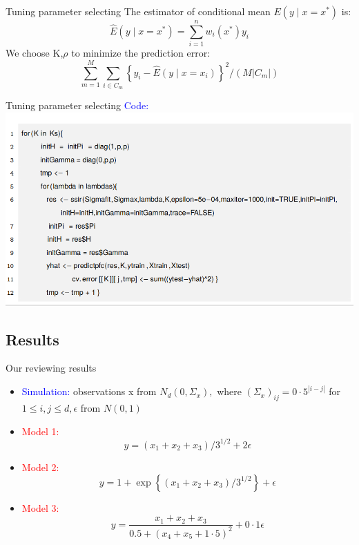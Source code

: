 \documentclass{beamer}
\begin{document}
\begin{frame}{Tuning parameter selecting}
    The estimator of conditional mean $E\left(y \mid x=x^{*}\right)$ is:
    $$\hat{E}\left(y \mid x=x^{*}\right)=\sum_{i=1}^{n} w_{i}\left(x^{*}\right) y_{i}$$
    We choose K,$\rho $ to minimize the prediction error:
    $$\sum_{m=1}^{M} \sum_{i \in C_{m}}\left\{y_{i}-\hat{E}\left(y \mid x=x_{i}\right)\right\}^{2} /\left(M\left|C_{m}\right|\right)$$
\end{frame}

\begin{frame}{Tuning parameter selecting}
    \textcolor{blue}{Code:}
    \centering \includegraphics[scale=0.3]{code2.png}
\end{frame}
\subsection{Results}

\begin{frame}{Our reviewing results}
  \begin{itemize}
  \item \textcolor{blue}{Simulation:} observations x from $N_{d}\left(0, \Sigma_{x}\right),$ where $\left(\Sigma_{x}\right)_{i j}=0 \cdot 5^{|i-j|}$ for $1 \leqslant i, j \leqslant d, \epsilon$ from $N(0,1)$
  \item \textcolor{red}{Model 1:} $$y=\left(x_{1}+x_{2}+x_{3}\right) / 3^{1 / 2}+2 \epsilon$$
  \item \textcolor{red}{Model 2:}$$y=1+\exp \left\{\left(x_{1}+x_{2}+x_{3}\right) / 3^{1 / 2}\right\}+\epsilon$$
  \item \textcolor{red}{Model 3:}$$y=\frac{x_{1}+x_{2}+x_{3}}{0.5+\left(x_{4}+x_{5}+1 \cdot 5\right)^{2}}+0 \cdot 1 \epsilon$$

  \end{itemize}
  
\end{frame}
\end{document}

